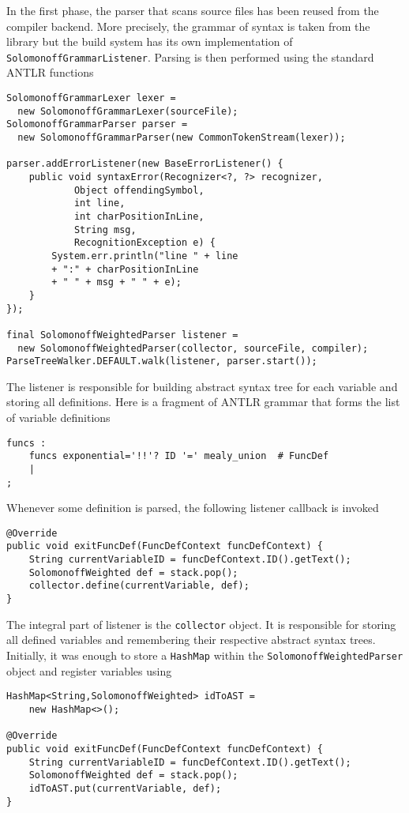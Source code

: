 In the first phase, the parser that scans source files has been reused from the compiler backend. More precisely, the grammar of syntax is taken from the library but the build system has its own implementation of \texttt{SolomonoffGrammarListener}. Parsing is then performed using the standard ANTLR functions
\begin{lstlisting}
SolomonoffGrammarLexer lexer =
  new SolomonoffGrammarLexer(sourceFile);
SolomonoffGrammarParser parser =
  new SolomonoffGrammarParser(new CommonTokenStream(lexer));

parser.addErrorListener(new BaseErrorListener() {
    public void syntaxError(Recognizer<?, ?> recognizer, 
            Object offendingSymbol, 
            int line,
            int charPositionInLine, 
            String msg, 
            RecognitionException e) {
    	System.err.println("line " + line 
    	+ ":" + charPositionInLine 
    	+ " " + msg + " " + e);
    }
});

final SolomonoffWeightedParser listener =
  new SolomonoffWeightedParser(collector, sourceFile, compiler);
ParseTreeWalker.DEFAULT.walk(listener, parser.start());
\end{lstlisting}
The listener is responsible for building abstract syntax tree for each variable and storing all definitions. Here is a fragment of ANTLR grammar that forms the list of variable definitions 
\begin{lstlisting}
funcs :
    funcs exponential='!!'? ID '=' mealy_union  # FuncDef
    | 
;
\end{lstlisting} 
Whenever some definition is parsed, the following listener callback is invoked
\begin{lstlisting}
@Override
public void exitFuncDef(FuncDefContext funcDefContext) {
    String currentVariableID = funcDefContext.ID().getText();
    SolomonoffWeighted def = stack.pop();
    collector.define(currentVariable, def);
}
\end{lstlisting}
The integral part of listener is the \texttt{collector} object. It is responsible for storing all defined variables and remembering their respective abstract syntax trees. Initially, it was enough to store a \texttt{HashMap} within the \texttt{SolomonoffWeightedParser} object and register variables using 
\begin{lstlisting}
HashMap<String,SolomonoffWeighted> idToAST = 
    new HashMap<>();
    
@Override
public void exitFuncDef(FuncDefContext funcDefContext) {
    String currentVariableID = funcDefContext.ID().getText();
    SolomonoffWeighted def = stack.pop();
    idToAST.put(currentVariable, def);
}
\end{lstlisting}
